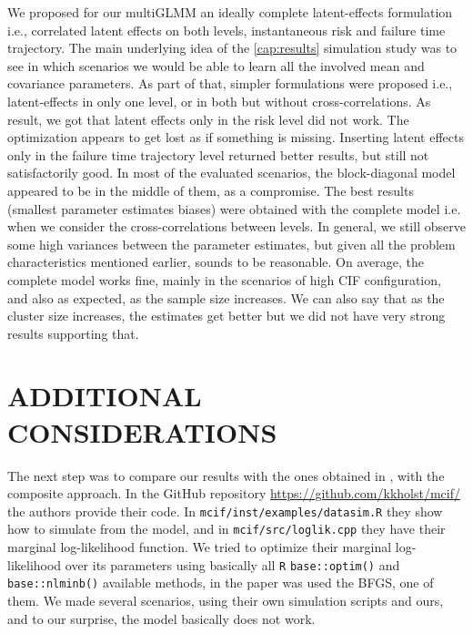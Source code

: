 We proposed for our multiGLMM an ideally complete latent-effects
formulation i.e., correlated latent effects on both levels,
instantaneous risk and failure time trajectory. The main underlying idea
of the \autoref{cap:results} simulation study was to see in which
scenarios we would be able to learn all the involved mean and covariance
parameters. As part of that, simpler formulations were proposed i.e.,
latent-effects in only one level, or in both but without
cross-correlations. As result, we got that latent effects only in the
risk level did not work. The optimization appears to get lost as if
something is missing. Inserting latent effects only in the failure time
trajectory level returned better results, but still not satisfactorily
good. In most of the evaluated scenarios, the block-diagonal model
appeared to be in the middle of them, as a compromise. The best results
(smallest parameter estimates biases) were obtained with the complete
model i.e. when we consider the cross-correlations between levels. In
general, we still observe some high variances between the parameter
estimates, but given all the problem characteristics mentioned earlier,
sounds to be reasonable. On average, the complete model works fine,
mainly in the scenarios of high CIF configuration, and also as expected,
as the sample size increases. We can also say that as the cluster size
increases, the estimates get better but we did not have very strong
results supporting that.

\section{ADDITIONAL CONSIDERATIONS}
\label{cap:addcon}

The next step was to compare our results with the ones obtained
in , with the composite approach. In the GitHub
repository
\url{https://github.com/kkholst/mcif/} the authors provide their
code. In \texttt{mcif/inst/examples/datasim.R} they show how to simulate
from the model, and in \texttt{mcif/src/loglik.cpp} they have their
marginal log-likelihood function. We tried to optimize their marginal
log-likelihood over its parameters using basically all \texttt{R}
\texttt{base::optim()} and \texttt{base::nlminb()} available methods, in
the paper was used the BFGS, one of them. We made several scenarios,
using their own simulation scripts and ours, and to our surprise, the
model basically does not work.

